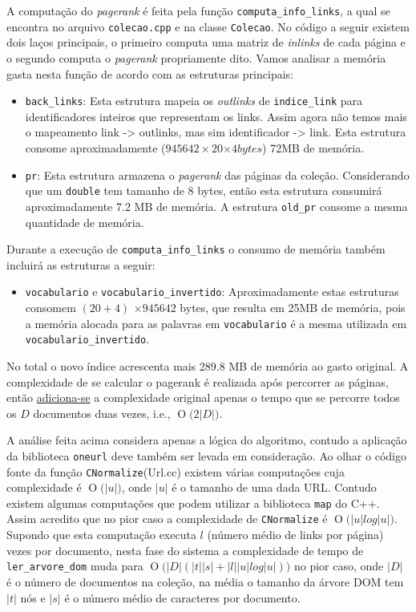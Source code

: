 \documentclass[a4paper]{article}
\newcommand{\BigO}[1]{\ensuremath{\operatorname{O}\bigl(#1\bigr)}}
\begin{document}
A computação do \emph{pagerank} é feita pela função \texttt{computa\_info\_links}, a qual se 
encontra no arquivo \texttt{colecao.cpp} e na classe \texttt{Colecao}. No código a seguir existem 
dois laços principais, o primeiro computa uma matriz de \emph{inlinks} de cada página e o segundo 
computa o \emph{pagerank} propriamente dito. Vamos analisar a memória 
gasta nesta função de acordo com as estruturas principais:

  \begin{itemize}
      \item \texttt{back\_links}: Esta estrutura mapeia os \emph{outlinks} de \texttt{indice\_link} 
	  para identificadores inteiros que representam os links. Assim agora não temos mais o mapeamento 
	  link -> outlinks, mas sim identificador -> link. Esta estrutura consome aproximadamente 
	  ($945642\times20$$\times4bytes$) 72MB de memória.
      \item \texttt{pr}: Esta estrutura armazena o \emph{pagerank} das páginas da coleção. Considerando 
	  que um \texttt{double} tem tamanho de 8 bytes, então esta estrutura consumirá aproximadamente 
	  7.2 MB de memória. A estrutura \texttt{old\_pr} consome a mesma quantidade de memória.
  \end{itemize}



Durante a execução de \texttt{computa\_info\_links} o consumo de memória também incluirá as estruturas 
a seguir:
   \begin{itemize}
       \item \texttt{vocabulario} e \texttt{vocabulario\_invertido}: Aproximadamente estas estruturas consomem 
	   $(20+4)$ $\times 945642$ bytes, que resulta em 25MB de memória, pois a memória alocada para as palavras em 
	   \texttt{vocabulario} é a mesma utilizada em \texttt{vocabulario\_invertido}.
   \end{itemize}


No total o novo índice acrescenta mais 289.8 MB de memória ao gasto original. A complexidade de 
se calcular o pagerank é realizada após percorrer as páginas, então \underline{adiciona-se} a complexidade 
original apenas o tempo que se percorre todos os $D$ documentos duas vezes, i.e., \BigO{2|D|}.

A análise feita acima considera apenas a lógica do algoritmo, contudo a aplicação da
biblioteca \texttt{oneurl} deve também ser levada em consideração. Ao olhar o código fonte da função 
\texttt{CNormalize}(Url.cc) existem várias computações 
cuja complexidade é \BigO{|u|}, onde $|u|$ é o tamanho de uma dada URL. Contudo existem 
algumas computações que podem utilizar a biblioteca \texttt{map} do C++. Assim acredito que 
no pior caso a complexidade de \texttt{CNormalize} é \BigO{|u|log|u|}. Supondo que esta computação 
executa $l$ (número médio de links por página) vezes por documento,  nesta fase do sistema 
a complexidade de tempo de \texttt{ler\_arvore\_dom} muda para 
 \BigO{|D|(|t||s|+|l||u|log|u|)} no pior caso, onde $|D|$ é o número de documentos  
 na coleção, na média o tamanho da árvore DOM tem $|t|$ nós e 
$|s|$ é o número médio de caracteres por documento.
\end{document}
